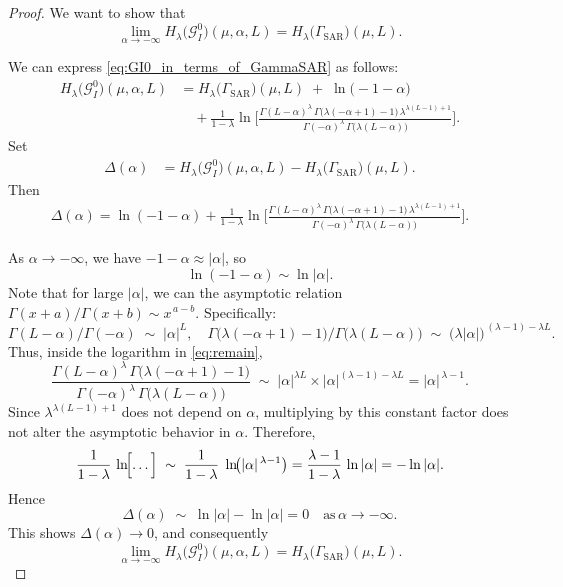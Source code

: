 \documentclass[11pt,]{article}
\begin{document}
\begin{proof}
We want to show that 
\[
\lim_{\alpha \to -\infty}
H_\lambda\bigl(\mathcal{G}^0_I\bigr)(\mu, \alpha, L)
=
H_\lambda\bigl(\Gamma_{\mathrm{SAR}}\bigr)(\mu, L).
\]

We can express \eqref{eq:GI0_in_terms_of_GammaSAR} as follows:
\begin{align*}
H_\lambda\bigl(\mathcal{G}^0_I\bigr)(\mu,\alpha,L)
&=
H_\lambda\bigl(\Gamma_{\mathrm{SAR}}\bigr)(\mu,L)
\;+\;
\ln\!\bigl(-1-\alpha\bigr)
\\
&\quad
+ \frac{1}{1-\lambda}
\ln \Biggl[
  \frac{
    \Gamma(L-\alpha)^{\lambda}\,\Gamma\bigl(\lambda(-\alpha+1)-1\bigr)\,\lambda^{\lambda(L-1)+1}
  }{
    \Gamma(-\alpha)^{\lambda}\,\Gamma\bigl(\lambda(L-\alpha)\bigr)
  }
\Biggr].
\end{align*}
Set
\begin{align*}
\Delta(\alpha)
&=
H_\lambda\bigl(\mathcal{G}^0_I\bigr)(\mu,\alpha,L)
-
H_\lambda\bigl(\Gamma_{\mathrm{SAR}}\bigr)(\mu,L).
\end{align*}
Then 
\begin{align}
\Delta(\alpha)
=
\ln(-1-\alpha)
+
\frac{1}{1-\lambda}
\ln \biggl[
  \frac{
    \Gamma(L-\alpha)^{\lambda}\,\Gamma\bigl(\lambda(-\alpha+1)-1\bigr)\,\lambda^{\lambda(L-1)+1}
  }{
    \Gamma(-\alpha)^{\lambda}\,\Gamma\bigl(\lambda(L-\alpha)\bigr)
  }
\biggr].
\label{eq:remain}
\end{align}

As \(\alpha \to -\infty\), we have \(-1-\alpha \approx |\alpha|\), so 
\[
\ln(-1-\alpha) 
\sim 
\ln|\alpha|.
\]
Note that for large \(|\alpha|\), we can the asymptotic relation 
\(
\Gamma(x+a)/\Gamma(x+b) 
\sim 
x^{\,a-b}
\).
Specifically:
\[
\Gamma(L-\alpha)/\Gamma(-\alpha) \;\sim\; |\alpha|^L,
\quad
\Gamma\bigl(\lambda(-\alpha+1)-1\bigr)/\Gamma\bigl(\lambda(L-\alpha)\bigr)
\;\sim\; 
\bigl(\lambda|\alpha|\bigr)^{\,(\lambda-1)-\lambda L}.
\]
Thus, inside the logarithm in \eqref{eq:remain},
\[
\frac{
  \Gamma(L-\alpha)^{\lambda}\,\Gamma\bigl(\lambda(-\alpha+1)-1\bigr)
}{
  \Gamma(-\alpha)^{\lambda}\,\Gamma\bigl(\lambda(L-\alpha)\bigr)
}
\;\sim\;
|\alpha|^{\lambda L}
\times
|\alpha|^{(\lambda-1)-\lambda L}
=
|\alpha|^{\,\lambda-1}.
\]
Since \(\lambda^{\lambda(L-1)+1}\)  does not depend on \(\alpha\), multiplying by this constant factor does not alter the asymptotic behavior in \(\alpha\). Therefore,
\[
\frac{1}{1-\lambda}\,
\ln\!\Bigl[\dots\Bigr]
\;\sim\;
\frac{1}{1-\lambda}\;\ln\!\bigl(|\alpha|^{\,\lambda-1}\bigr)
=
\frac{\lambda-1}{1-\lambda}\,\ln|\alpha|
=
-\ln|\alpha|.
\]
Hence
\[
\Delta(\alpha)
\;\sim\;
\ln|\alpha|
-
\ln|\alpha|
=
0
\quad
\text{as}\, \alpha\to -\infty.
\]
This shows 
\(\Delta(\alpha)\to 0\), 
and consequently
\[
\lim_{\alpha \to -\infty}
H_\lambda\bigl(\mathcal{G}^0_I\bigr)(\mu,\alpha,L)
=
H_\lambda\bigl(\Gamma_{\mathrm{SAR}}\bigr)(\mu,L).
\]
\end{proof}
\end{document}
